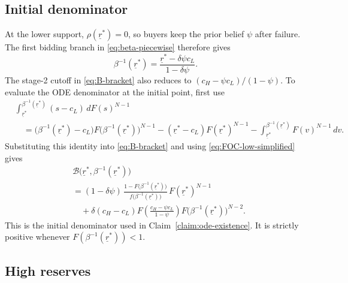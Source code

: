 \subsection{Initial denominator}
\label{app:B-FOC}

At the lower support, $\rho(\underline{r}^{*})=0$, so buyers keep the prior
belief $\psi$ after failure.  The first bidding branch in
\eqref{eq:beta-piecewise} therefore gives
\begin{equation*}
  \beta^{-1}(\underline{r}^{*})
  = \frac{\underline{r}^{*}-\delta\psi c_L}{1-\delta\psi}.
\end{equation*}
The stage-2 cutoff in \eqref{eq:B-bracket} also reduces to
$(c_H-\psi c_L)/(1-\psi)$.  To evaluate the ODE denominator at the initial
point, first use
\begin{equation*}
  \begin{aligned}
  &\int_{\underline{r}^{*}}^{\beta^{-1}(\underline{r}^{*})}
    (s-c_L)\,dF(s)^{N-1} \\
  &\quad =
    \bigl(\beta^{-1}(\underline{r}^{*})-c_L\bigr)
    F\!\bigl(\beta^{-1}(\underline{r}^{*})\bigr)^{N-1}
    - (\underline{r}^{*}-c_L)F(\underline{r}^{*})^{N-1}
    - \int_{\underline{r}^{*}}^{\beta^{-1}(\underline{r}^{*})}
      F(v)^{N-1}\,dv .
  \end{aligned}
\end{equation*}
Substituting this identity into \eqref{eq:B-bracket} and using
\eqref{eq:FOC-low-simplified} gives
\begin{align*}
  &\mathcal{B}\bigl(\underline{r}^{*},
    \beta^{-1}(\underline{r}^{*})\bigr)
  \\
  &= (1-\delta\psi)\,
    \frac{1 - F\!\bigl(\beta^{-1}(\underline{r}^{*})\bigr)}{
      f\!\bigl(\beta^{-1}(\underline{r}^{*})\bigr)
    }\,
    F(\underline{r}^{*})^{N-1}
  \\
  &\quad + \delta (c_H - c_L)
      F\!\left(\frac{c_H - \psi c_L}{1 - \psi}\right)
      F\!\bigl(\beta^{-1}(\underline{r}^{*})\bigr)^{N-2}.
\end{align*}
This is the initial denominator used in Claim~\ref{claim:ode-existence}.  It is
strictly positive whenever
$F(\beta^{-1}(\underline{r}^{*}))<1$.

\subsection{High reserves}
\label{app:high-r}

